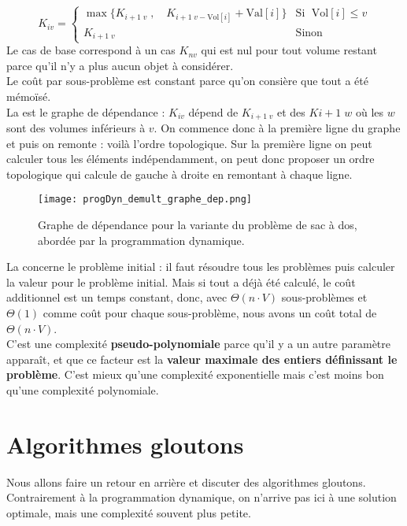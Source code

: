 \documentclass[12pt,a4paper]{book}
\begin{document}
$$\boxed{K_{iv} = \left\{ \begin{array}{lr}
\max\{K_{i+1 \; v}\; , \quad K_{i+1 \; v-\text{Vol}[i]} + \text{Val}[i]\} &\text{Si } \; \text{Vol}[i] \leq v \\
K_{i+1 \; v} & \text{Sinon}
\end{array} \right. }$$
Le cas de base correspond à un cas $K_{nv}$ qui est nul pour tout volume restant parce qu'il n'y a plus aucun objet à considérer. \\

Le coût par sous-problème est constant parce qu'on consière que tout a été mémoïsé. \\

La \textbf{} est le graphe de dépendance : $K_{iv}$ dépend de $K_{i+1 \; v}$ et des $K{i+1 \; w}$ où les $w$ sont des volumes inférieurs à $v$. On commence donc à la première ligne du graphe et puis on remonte : voilà l'ordre topologique. Sur la première ligne on peut calculer tous les éléments indépendamment, on peut donc proposer un ordre topologique qui calcule de gauche à droite en remontant à chaque ligne. \\

\begin{figure}[h]
\texttt{[image: progDyn\_demult\_graphe\_dep.png]}
\caption{Graphe de dépendance pour la variante du problème de sac à dos, abordée par la programmation dynamique.}
\label{fig:progDyn_demult_graphe_dep}
\end{figure}

La \textbf{} concerne le problème initial : il faut résoudre tous les problèmes puis calculer la valeur pour le problème initial. Mais si tout a déjà été calculé, le coût additionnel est un temps constant, donc, avec $\Theta(n\cdot V)$ sous-problèmes et $\Theta(1)$ comme coût pour chaque sous-problème, nous avons un coût total de $\Theta(n \cdot V)$. \\

C'est une complexité \textbf{pseudo-polynomiale} parce qu'il y a un autre paramètre apparaît, et que ce facteur est la \textbf{valeur maximale des entiers définissant le problème}. C'est mieux qu'une complexité exponentielle mais c'est moins bon qu'une complexité polynomiale.
\section{Algorithmes gloutons}
Nous allons faire un retour en arrière et discuter des algorithmes gloutons. Contrairement à la programmation dynamique, on n'arrive pas ici à une solution optimale, mais une complexité souvent plus petite. \\
\end{document}

